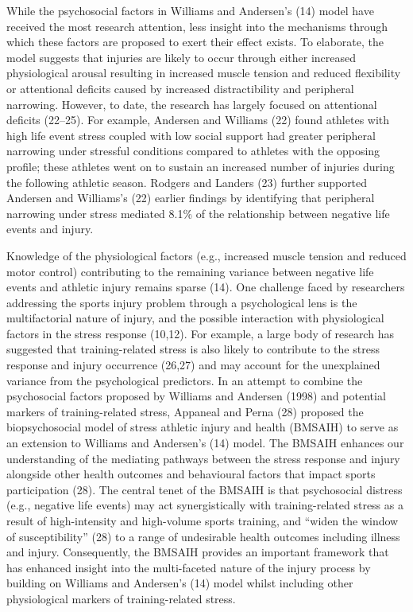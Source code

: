 \documentclass[
  english,
  man]{apa6}
\begin{document}
While the psychosocial factors in Williams and Andersen's (14) model have received the most research attention, less insight into the mechanisms through which these factors are proposed to exert their effect exists.
To elaborate, the model suggests that injuries are likely to occur through either increased physiological arousal resulting in increased muscle tension and reduced flexibility or attentional deficits caused by increased distractibility and peripheral narrowing.
However, to date, the research has largely focused on attentional deficits (22--25).
For example, Andersen and Williams (22) found athletes with high life event stress coupled with low social support had greater peripheral narrowing under stressful conditions compared to athletes with the opposing profile; these athletes went on to sustain an increased number of injuries during the following athletic season.
Rodgers and Landers (23) further supported Andersen and Williams's (22) earlier findings by identifying that peripheral narrowing under stress mediated 8.1\% of the relationship between negative life events and injury.

Knowledge of the physiological factors (e.g., increased muscle tension and reduced motor control) contributing to the remaining variance between negative life events and athletic injury remains sparse (14).
One challenge faced by researchers addressing the sports injury problem through a psychological lens is the multifactorial nature of injury, and the possible interaction with physiological factors in the stress response (10,12).
For example, a large body of research has suggested that training-related stress is also likely to contribute to the stress response and injury occurrence (26,27) and may account for the unexplained variance from the psychological predictors.
In an attempt to combine the psychosocial factors proposed by Williams and Andersen (1998) and potential markers of training-related stress, Appaneal and Perna (28) proposed the biopsychosocial model of stress athletic injury and health (BMSAIH) to serve as an extension to Williams and Andersen's (14) model.
The BMSAIH enhances our understanding of the mediating pathways between the stress response and injury alongside other health outcomes and behavioural factors that impact sports participation (28).
The central tenet of the BMSAIH is that psychosocial distress (e.g., negative life events) may act synergistically with training-related stress as a result of high-intensity and high-volume sports training, and ``widen the window of susceptibility'' (28) to a range of undesirable health outcomes including illness and injury.
Consequently, the BMSAIH provides an important framework that has enhanced insight into the multi-faceted nature of the injury process by building on Williams and Andersen's (14) model whilst including other physiological markers of training-related stress.
\end{document}
